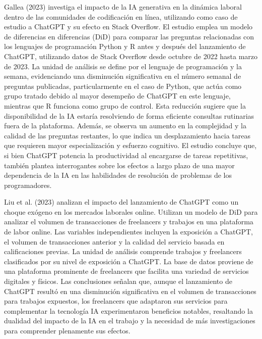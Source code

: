 \documentclass[12pt,a4paper]{article}
\begin{document}
Gallea (2023) investiga el impacto de la IA generativa en la dinámica laboral dentro de las comunidades de codificación en línea, utilizando como caso de estudio a ChatGPT y su efecto en Stack Overflow. El estudio emplea un modelo de diferencias en diferencias (DiD) para comparar las preguntas relacionadas con los lenguajes de programación Python y R antes y después del lanzamiento de ChatGPT, utilizando datos de Stack Overflow desde octubre de 2022 hasta marzo de 2023. La unidad de análisis se define por el lenguaje de programación y la semana, evidenciando una disminución significativa en el número semanal de preguntas publicadas, particularmente en el caso de Python, que actúa como grupo tratado debido al mayor desempeño de ChatGPT en este lenguaje, mientras que R funciona como grupo de control. Esta reducción sugiere que la disponibilidad de la IA estaría resolviendo de forma eficiente consultas rutinarias fuera de la plataforma. Además, se observa un aumento en la complejidad y la calidad de las preguntas restantes, lo que indica un desplazamiento hacia tareas que requieren mayor especialización y esfuerzo cognitivo. El estudio concluye que, si bien ChatGPT potencia la productividad al encargarse de tareas repetitivas, también plantea interrogantes sobre los efectos a largo plazo de una mayor dependencia de la IA en las habilidades de resolución de problemas de los programadores.

Liu et al. (2023) analizan el impacto del lanzamiento de ChatGPT como un choque exógeno en los mercados laborales online. Utilizan un modelo de DiD para analizar el volumen de transacciones de freelancers y trabajos en una plataforma de labor online. Las variables independientes incluyen la exposición a ChatGPT, el volumen de transacciones anterior y la calidad del servicio basada en calificaciones previas. La unidad de análisis comprende trabajos y freelancers clasificados por su nivel de exposición a ChatGPT. La base de datos proviene de una plataforma prominente de freelancers que facilita una variedad de servicios digitales y físicos. Las conclusiones señalan que, aunque el lanzamiento de ChatGPT resultó en una disminución significativa en el volumen de transacciones para trabajos expuestos, los freelancers que adaptaron sus servicios para complementar la tecnología IA experimentaron beneficios notables, resaltando la dualidad del impacto de la IA en el trabajo y la necesidad de más investigaciones para comprender plenamente sus efectos.
\end{document}
